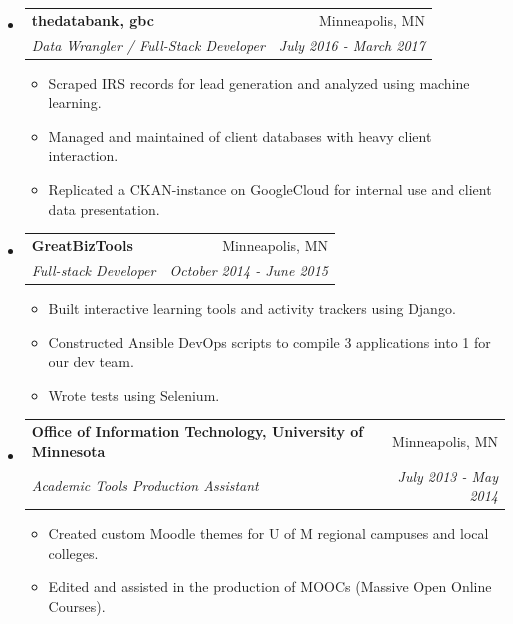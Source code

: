 \documentclass[letterpaper,11pt]{article}
\makeatletter
\newcommand{\resitem}[1]{\item #1 \vspace{-3pt}}
\newcommand{\ressubheading}[4]{
\begin{tabular*}{6.75in}{l@{\extracolsep{\fill}}r}
		\textbf{#1} & #2 \\
		\textit{#3} & \textit{#4} \\
\end{tabular*}\vspace{-6pt}}
\makeatother
\begin{document}
\begin{itemize}[label={}]


\item
	\ressubheading{thedatabank, gbc}{Minneapolis, MN}{Data Wrangler / Full-Stack Developer}{July 2016 - March 2017}
	\begin{itemize}[label={--}]
        \resitem{Scraped IRS records for lead generation and analyzed using machine learning.}
		\resitem{Managed and maintained  of client databases with heavy client interaction.}
		\resitem{Replicated a CKAN-instance on GoogleCloud for internal use and client data presentation.}\\
	\end{itemize}
\vspace{.25cm}

\item
	\ressubheading{GreatBizTools}{Minneapolis, MN}{Full-stack Developer}{October 2014 - June 2015}
	\begin{itemize}[label={--}]
		\resitem{Built interactive learning tools and activity trackers using Django.}
		\resitem{Constructed Ansible DevOps scripts to compile 3 applications into 1 for our dev team.}
		\resitem{Wrote tests using Selenium.}\\
	\end{itemize}
\vspace{.25cm}

\item
	\ressubheading{Office of Information Technology, University of Minnesota}{Minneapolis, MN}{Academic Tools Production Assistant}{July 2013 - May 2014}
	\begin{itemize}[label={--}]
		\resitem{Created custom Moodle themes for U of M regional campuses and local colleges.}
		\resitem{Edited and assisted in the production of MOOCs (Massive Open Online Courses).}
	\end{itemize}
\end{itemize}
\end{document}
